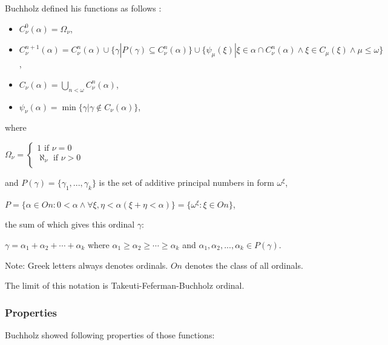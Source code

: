 \documentclass[10pt]{article}
\begin{document}
Buchholz defined his functions as follows :

\begin{itemize}
     \setlength{\itemsep}{1pt}
     \setlength{\parskip}{0pt}
     \setlength{\parsep}{0pt}

\item \(C_\nu^0(\alpha) = \Omega_\nu\),

\item \(C_\nu^{n+1}(\alpha) = C_\nu^n(\alpha) \cup \{\gamma | P(\gamma) \subseteq C_\nu^n(\alpha)\} \cup \{\psi_\mu(\xi) | \xi \in \alpha \cap C_\nu^n(\alpha) \wedge \xi \in C_\mu(\xi) \wedge \mu \leq \omega\}\),

\item \(C_\nu(\alpha) = \bigcup_{n < \omega} C_\nu^n (\alpha)\),

\item \(\psi_\nu(\alpha) = \min\{\gamma | \gamma \not\in C_\nu(\alpha)\}\),

\end{itemize}

where

\(\Omega_\nu=\left\{\begin{array}{lcr} 1\text{ if }\nu=0\\ \aleph_\nu\text{ if }\nu>0\\ \end{array}\right.\)

and \(P(\gamma)=\{\gamma_1,...,\gamma_k\}\) is the set of additive principal numbers in form \(\omega^\xi\),

\(P=\{\alpha\in On: 0<\alpha \wedge \forall \xi, \eta < \alpha (\xi+\eta < \alpha)\}=\{\omega^\xi: \xi \in On\}\),

the sum of which gives this ordinal \(\gamma\):

\(\gamma=\alpha_1+\alpha_2+\cdots+\alpha_k\) where \(\alpha_1\geq\alpha_2\geq\cdots\geq\alpha_k\) and \(\alpha_1,\alpha_2,...,\alpha_k \in P(\gamma)\).

Note: Greek letters always denotes ordinals. \(On\) denotes the class of all ordinals.

The limit of this notation is Takeuti-Feferman-Buchholz ordinal.


\subsubsection{Properties}


Buchholz showed following properties of those functions:
\end{document}
